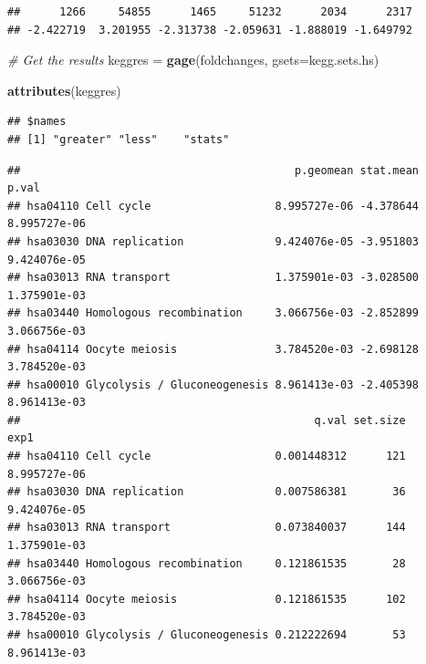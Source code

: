 \documentclass[
]{article}
\newenvironment{Shaded}{\begin{snugshade}}{\end{snugshade}}
\newcommand{\AttributeTok}[1]{\textcolor[rgb]{0.13,0.29,0.53}{#1}}
\newcommand{\CommentTok}[1]{\textcolor[rgb]{0.56,0.35,0.01}{\textit{#1}}}
\newcommand{\FunctionTok}[1]{\textcolor[rgb]{0.13,0.29,0.53}{\textbf{#1}}}
\newcommand{\NormalTok}[1]{#1}
\newcommand{\OtherTok}[1]{\textcolor[rgb]{0.56,0.35,0.01}{#1}}
\newcommand{\SpecialCharTok}[1]{\textcolor[rgb]{0.81,0.36,0.00}{\textbf{#1}}}
\begin{document}
\begin{verbatim}
##      1266     54855      1465     51232      2034      2317 
## -2.422719  3.201955 -2.313738 -2.059631 -1.888019 -1.649792
\end{verbatim}

\begin{Shaded}
\begin{Highlighting}[]
\CommentTok{\# Get the results}
\NormalTok{keggres }\OtherTok{=} \FunctionTok{gage}\NormalTok{(foldchanges, }\AttributeTok{gsets=}\NormalTok{kegg.sets.hs)}
\end{Highlighting}
\end{Shaded}

\begin{Shaded}
\begin{Highlighting}[]
\FunctionTok{attributes}\NormalTok{(keggres)}
\end{Highlighting}
\end{Shaded}

\begin{verbatim}
## $names
## [1] "greater" "less"    "stats"
\end{verbatim}

\begin{Shaded}
\end{Shaded}

\begin{verbatim}
##                                          p.geomean stat.mean        p.val
## hsa04110 Cell cycle                   8.995727e-06 -4.378644 8.995727e-06
## hsa03030 DNA replication              9.424076e-05 -3.951803 9.424076e-05
## hsa03013 RNA transport                1.375901e-03 -3.028500 1.375901e-03
## hsa03440 Homologous recombination     3.066756e-03 -2.852899 3.066756e-03
## hsa04114 Oocyte meiosis               3.784520e-03 -2.698128 3.784520e-03
## hsa00010 Glycolysis / Gluconeogenesis 8.961413e-03 -2.405398 8.961413e-03
##                                             q.val set.size         exp1
## hsa04110 Cell cycle                   0.001448312      121 8.995727e-06
## hsa03030 DNA replication              0.007586381       36 9.424076e-05
## hsa03013 RNA transport                0.073840037      144 1.375901e-03
## hsa03440 Homologous recombination     0.121861535       28 3.066756e-03
## hsa04114 Oocyte meiosis               0.121861535      102 3.784520e-03
## hsa00010 Glycolysis / Gluconeogenesis 0.212222694       53 8.961413e-03
\end{verbatim}
\end{document}
